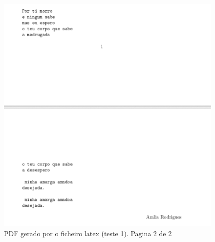 \begin{figure}
\includegraphics[width=15cm]{anexos/2-5/2-5-a-img2.png}
\caption{PDF gerado por o ficheiro latex (teste 1). Pagina 2 de 2}
\label{fig::anex-music-test-img}
\end{figure}

